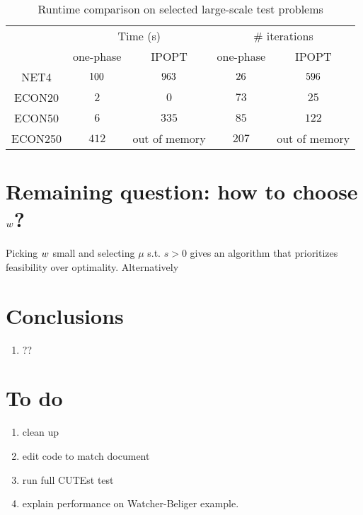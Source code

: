 \documentclass{article}
\begin{document}
\begin{table}[H]
\begin{tabular}{|c| c c | c c |}
  \hline
  \multirow{2}{*}{} 
      & \multicolumn{2}{c|}{Time (s)} 
          & \multicolumn{2}{|c|}{\# iterations} \\             \cline{2-5}
  & one-phase & IPOPT & one-phase & IPOPT \\  \hline
  NET4 & $100$ & $963$  & $26$   & $596$ \\      \hline
    ECON20 & $2$  & $0$  & $73$ & $25$   \\      \hline
  ECON50 & $6$  & $335$  & $85$ & $122$   \\      \hline
  ECON250 & $412$  &  out of memory & $207$ & out of memory \\      \hline
\end{tabular}
\caption{Runtime comparison on selected large-scale test problems}\label{compare-runtime}
\end{table}

\if{}
\section{Remaining question: how to choose $w$?}

Picking $w$ small and selecting $\mu$ s.t. $s > 0$ gives an algorithm that prioritizes feasibility over optimality. Alternatively 

\fi


\if{}


\section{Conclusions}
\begin{enumerate}
\item ??
\end{enumerate}


\section{To do}

\begin{enumerate}
\item clean up 
\item edit code to match document
\item run full CUTEst test
\item explain performance on Watcher-Beliger example.
\end{enumerate}
\end{document}
